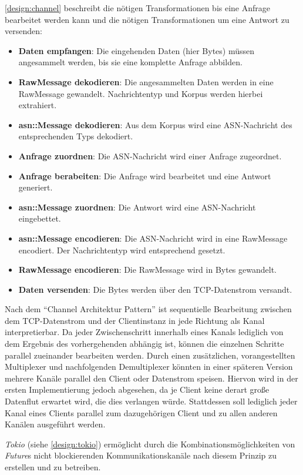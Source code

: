 \autoref{design:channel} beschreibt die nötigen Transformationen bis eine Anfrage bearbeitet werden kann und die nötigen Transformationen um eine Antwort zu versenden:
\begin{itemize}
	\item \textbf{Daten empfangen}: Die eingehenden Daten (hier Bytes) müssen angesammelt werden, bis sie eine komplette Anfrage abbilden.
	\item \textbf{RawMessage dekodieren}: Die angesammelten Daten werden in eine RawMessage gewandelt. Nachrichtentyp und Korpus werden hierbei extrahiert.
	\item \textbf{asn::Message dekodieren}: Aus dem Korpus wird eine ASN-Nachricht des entsprechenden Typs dekodiert.
	\item \textbf{Anfrage zuordnen}: Die ASN-Nachricht wird einer Anfrage zugeordnet.
	\item \textbf{Anfrage berabeiten}: Die Anfrage wird bearbeitet und eine Antwort generiert.
	\item \textbf{asn::Message zuordnen}: Die Antwort wird eine ASN-Nachricht eingebettet.
	\item \textbf{asn::Message encodieren}: Die ASN-Nachricht wird in eine RawMessage encodiert. Der Nachrichtentyp wird entsprechend gesetzt.
	\item \textbf{RawMessage encodieren}: Die RawMessage wird in Bytes gewandelt.
	\item \textbf{Daten versenden}: Die Bytes werden über den TCP-Datenstrom versandt.
\end{itemize}

Nach dem \enquote{Channel Architektur Pattern} ist sequentielle Bearbeitung zwischen dem TCP-Datenstrom und der Clientinstanz in jede Richtung als Kanal interpretierbar.
Da jeder Zwischenschritt innerhalb eines Kanals lediglich von dem Ergebnis des vorhergehenden abhängig ist, können die einzelnen Schritte parallel zueinander bearbeiten werden.
\todo{}
Durch einen zusätzlichen, vorangestellten Multiplexer und nachfolgenden Demultiplexer könnten in einer späteren Version mehrere Kanäle parallel den Client oder Datenstrom speisen.
Hiervon wird in der ersten Implementierung jedoch abgesehen, da je Client keine derart große Datenflut erwartet wird, die dies verlangen würde.
Stattdessen soll lediglich jeder Kanal eines Clients parallel zum dazugehörigen Client und zu allen anderen Kanälen ausgeführt werden.

\textit{Tokio} (siehe \autoref{design:tokio}) ermöglicht durch die Kombinationsmöglichkeiten von \textit{Future}s nicht blockierenden Kommunikationskanäle nach diesem Prinzip zu erstellen und zu betreiben.


